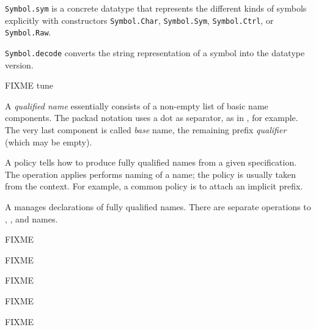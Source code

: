 \begin{isabellebody}
\begin{isamarkuptext}
\begin{description}
  \item \verb|Symbol.sym| is a concrete datatype that represents
  the different kinds of symbols explicitly with constructors \verb|Symbol.Char|, \verb|Symbol.Sym|, \verb|Symbol.Ctrl|, or \verb|Symbol.Raw|.

  \item \verb|Symbol.decode| converts the string representation of a
  symbol into the datatype version.

  \end{description}%
\end{isamarkuptext}%
\isamarkuptrue%
%
\endisatagmlref
{\isafoldmlref}%
%
\isadelimmlref
%
\endisadelimmlref
%
\isamarkuptrue%
%
\isadelimFIXME
%
\endisadelimFIXME
%
\isatagFIXME
%
\begin{isamarkuptext}%
FIXME tune

  A \emph{qualified name} essentially consists of a non-empty list of
  basic name components.  The packad notation uses a dot as separator,
  as in , for example.  The very last component is called
  \emph{base} name, the remaining prefix \emph{qualifier} (which may
  be empty).

  A  policy tells how to produce fully qualified names
  from a given specification.  The  operation applies
  performs naming of a name; the policy is usually taken from the
  context.  For example, a common policy is to attach an implicit
  prefix.

  A  manages declarations of fully qualified
  names.  There are separate operations to , , and  names.

  FIXME%
\end{isamarkuptext}%
\isamarkuptrue%
%
\endisatagFIXME
{\isafoldFIXME}%
%
\isadelimFIXME
%
\endisadelimFIXME
%
\isadelimmlref
%
\endisadelimmlref
%
\isatagmlref
%
\begin{isamarkuptext}%
FIXME%
\end{isamarkuptext}%
\isamarkuptrue%
%
\endisatagmlref
{\isafoldmlref}%
%
\isadelimmlref
%
\endisadelimmlref
%
\isamarkuptrue%
%
\isamarkuptrue%
%
\begin{isamarkuptext}%
FIXME%
\end{isamarkuptext}%
\isamarkuptrue%
%
\isamarkuptrue%
%
\begin{isamarkuptext}%
FIXME%
\end{isamarkuptext}%
\isamarkuptrue%
%
\isamarkuptrue%
%
\begin{isamarkuptext}%
FIXME%
\end{isamarkuptext}%
\isamarkuptrue%
%
\isadelimtheory
%
\endisadelimtheory
%
\isatagtheory
{}\isamarkupfalse%
%
\endisatagtheory
{\isafoldtheory}%
%
\isadelimtheory
%
\endisadelimtheory
\isanewline
\end{isabellebody}%
